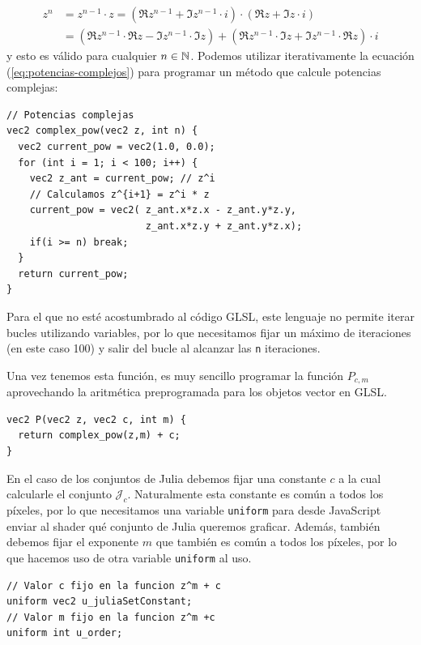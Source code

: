 \begin{equation}
    \label{eq:potencias-complejos}
    \begin{split}
        z^n & = z^{n-1}\cdot z = (\Re z^{n-1} + \Im z^{n-1}\cdot i)\cdot(\Re z + \Im z\cdot i) \\
        & = \left(\Re z^{n-1}\cdot\Re z - \Im z^{n-1}\cdot \Im z\right) + \left(\Re z^{n-1}\cdot\Im z + \Im z^{n-1}\cdot\Re z\right)\cdot i 
    \end{split}
\end{equation}
y esto es válido para cualquier $n\in\mathbb{N}$. Podemos utilizar iterativamente la ecuación (\ref{eq:potencias-complejos}) para programar un método que calcule potencias complejas:
\begin{lstlisting}
// Potencias complejas
vec2 complex_pow(vec2 z, int n) {
  vec2 current_pow = vec2(1.0, 0.0);
  for (int i = 1; i < 100; i++) {
    vec2 z_ant = current_pow; // z^i
    // Calculamos z^{i+1} = z^i * z
    current_pow = vec2( z_ant.x*z.x - z_ant.y*z.y, 
                        z_ant.x*z.y + z_ant.y*z.x);
    if(i >= n) break;
  }
  return current_pow;
}
\end{lstlisting}

Para el que no esté acostumbrado al código GLSL, este lenguaje no permite iterar bucles utilizando variables, por lo que necesitamos fijar un máximo de iteraciones (en este caso 100) y salir del bucle al alcanzar las \verb|n| iteraciones.

Una vez tenemos esta función, es muy sencillo programar la función $P_{c,m}$ aprovechando la aritmética preprogramada para los objetos vector en GLSL.

\begin{lstlisting}
vec2 P(vec2 z, vec2 c, int m) {
  return complex_pow(z,m) + c;
}
\end{lstlisting}

En el caso de los conjuntos de Julia debemos fijar una constante $c$ a la cual calcularle el conjunto $\mathcal{J}_c$. Naturalmente esta constante es común a todos los píxeles, por lo que necesitamos una variable \verb|uniform| para desde JavaScript enviar al shader qué conjunto de Julia queremos graficar. Además, también debemos fijar el exponente $m$ que también es común a todos los píxeles, por lo que hacemos uso de otra variable \verb|uniform| al uso.

\begin{lstlisting}
// Valor c fijo en la funcion z^m + c
uniform vec2 u_juliaSetConstant;
// Valor m fijo en la funcion z^m +c
uniform int u_order;
\end{lstlisting}

